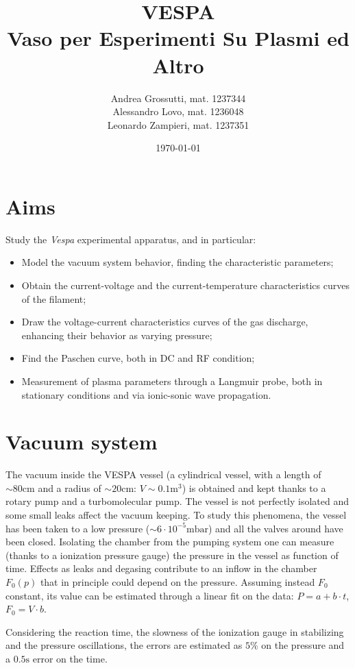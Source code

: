 \documentclass[11pt,a4 paper]{article}
\title{VESPA\\Vaso per Esperimenti Su Plasmi ed Altro}
\author{Andrea Grossutti, mat. 1237344\\Alessandro Lovo, mat. 1236048\\Leonardo Zampieri, mat. 1237351}
\date{\today}
\begin{document}
\maketitle

\section{Aims}
Study the \emph{Vespa} experimental apparatus, and in particular:
\begin{itemize}[noitemsep]
    \item Model the vacuum system behavior, finding the characteristic parameters;
    \item Obtain the current-voltage and the current-temperature characteristics curves of the filament;
    \item Draw the voltage-current characteristics curves of the gas discharge, enhancing their behavior as varying pressure;
    \item Find the Paschen curve, both in DC and RF condition;
    \item Measurement of plasma parameters through a Langmuir probe, both in stationary conditions and via ionic-sonic wave propagation.
\end{itemize}


\section{Vacuum system}
The vacuum inside the VESPA vessel (a cylindrical  vessel, with a length of $\sim80\si{\centi\metre}$ and a radius of $\sim20\si{\centi\metre}$: $V\sim0.1\si{\metre^3}$) is obtained and kept thanks to a rotary pump and a turbomolecular pump. The vessel is not perfectly isolated and some small leaks affect the vacuum keeping. To study this phenomena, the vessel has been taken to a low pressure ($\sim 6 \cdot 10^{-5} \si{\milli\bar}$) and all the valves around have been closed. Isolating the chamber from the pumping system one can measure (thanks to a ionization pressure gauge) the pressure in the vessel as function of time. Effects as leaks and degasing contribute to an inflow in the chamber $F_0(p)$ that in principle could depend on the pressure. Assuming instead $F_0$ constant, its value can be estimated through a linear fit on the data: $P = a + b \cdot t$, $F_0 = V \cdot b$.

Considering the reaction time, the slowness of the ionization gauge in stabilizing and the pressure oscillations, the errors are estimated as $5\%$ on the pressure and a $0.5\si{\second}$ error on the time.
\end{document}
